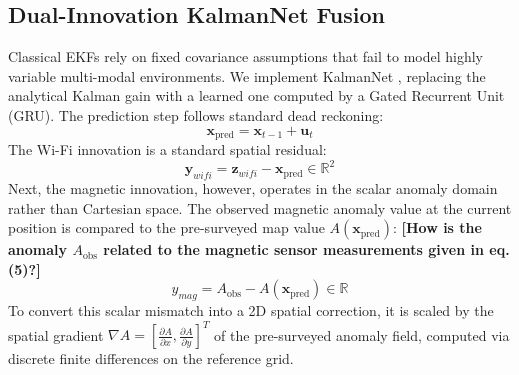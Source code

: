 \documentclass[conference]{IEEEtran}
\begin{document}
\subsection{Dual-Innovation KalmanNet Fusion}\label{sec:kalmannet}

Classical EKFs rely on fixed covariance assumptions that fail to model highly variable multi-modal environments. We implement KalmanNet \cite{kalmannet}, replacing the analytical Kalman gain with a learned one computed by a Gated Recurrent Unit (GRU). The prediction step follows standard dead reckoning:
\begin{equation}
\mathbf{x}_{\text{pred}} = \mathbf{x}_{t-1} + \mathbf{u}_t \label{eq:kn_predict}
\end{equation}
The Wi-Fi innovation is a standard spatial residual:
\begin{equation}
\mathbf{y}_{wifi} = \mathbf{z}_{wifi} - \mathbf{x}_{\text{pred}} \in \mathbb{R}^2 \label{eq:kn_innovate_w}
\end{equation}
Next, the magnetic innovation, however, operates in the scalar anomaly domain rather than Cartesian space. The observed magnetic anomaly value at the current position is compared to the pre-surveyed map value $A(\mathbf{x}_{\text{pred}})$: \textbf{\color{red}[How is the anomaly $A_{\text{obs}}$ related to the magnetic sensor measurements given in eq.(5)?]}
\begin{equation}
y_{mag} = A_{\text{obs}} - A(\mathbf{x}_{\text{pred}}) \in \mathbb{R} \label{eq:kn_innovate_m}
\end{equation}
To convert this scalar mismatch into a 2D spatial correction, it is scaled by the spatial gradient $\nabla A = [\frac{\partial A}{\partial x}, \frac{\partial A}{\partial y}]^T$ of the pre-surveyed anomaly field, computed via discrete finite differences on the reference grid.
\end{document}

